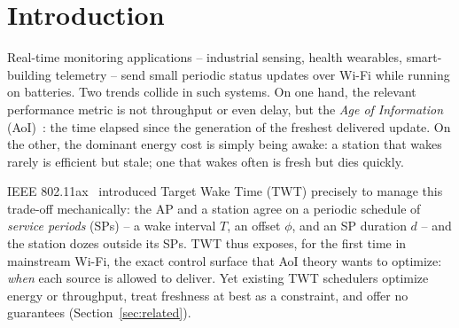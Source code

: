 \section{Introduction}
\label{sec:intro}

Real-time monitoring applications -- industrial sensing, health wearables,
smart-building telemetry -- send small periodic status updates over Wi-Fi
while running on batteries. Two trends collide in such systems. On one hand,
the relevant performance metric is not throughput or even delay, but the
\emph{Age of Information} (AoI)~\cite{kaul12,yates21}: the time elapsed since
the generation of the freshest delivered update. On the other, the dominant energy cost is simply
being awake: a station that wakes rarely is efficient but stale; one that
wakes often is fresh but dies quickly.

IEEE 802.11ax~\cite{ieee80211ax} introduced Target Wake Time (TWT) precisely
to manage this trade-off mechanically: the AP and a station agree on a
periodic schedule of \emph{service periods} (SPs) -- a wake interval $T$, an offset $\phi$, and an
SP duration $d$ -- and the station dozes outside its SPs. TWT thus exposes,
for the first time in mainstream Wi-Fi, the exact control surface that AoI
theory wants to optimize: \emph{when} each source is allowed to deliver.
Yet existing TWT schedulers optimize energy or throughput, treat freshness at
best as a constraint, and offer no guarantees
(Section~\ref{sec:related}).

